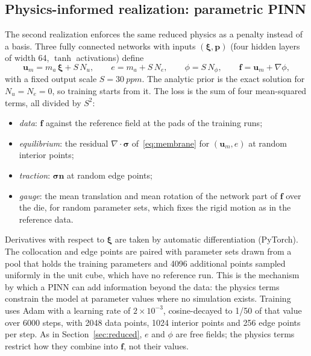 \documentclass[11pt]{article}
\begin{document}
\subsection{Physics-informed realization: parametric PINN}\label{sec:pinn}
The second realization enforces the same reduced physics as a penalty instead of a basis. Three fully connected
networks with inputs $(\boldsymbol\xi,\mathbf{p})$ (four hidden layers of width 64, $\tanh$ activations) define
\begin{equation}
  \mathbf{u}_m = m_a\,\boldsymbol\xi + S\,N_u,\qquad e = m_a + S\,N_e,\qquad \phi = S\,N_\phi,\qquad
  \mathbf{f} = \mathbf{u}_m + \nabla\phi ,
\end{equation}
with a fixed output scale $S=\SI{30}{ppm}$. The analytic prior is the exact solution for $N_u=N_e=0$, so training starts
from it. The loss is the sum of four mean-squared terms, all divided by $S^2$:
\begin{itemize}
  \item \emph{data}: $\mathbf{f}$ against the reference field at the pads of the training runs;
  \item \emph{equilibrium}: the residual $\nabla\cdot\boldsymbol\sigma$ of~\eqref{eq:membrane} for $(\mathbf{u}_m,e)$ at
        random interior points;
  \item \emph{traction}: $\boldsymbol\sigma\mathbf{n}$ at random edge points;
  \item \emph{gauge}: the mean translation and mean rotation of the network part of $\mathbf{f}$ over the die, for
        random parameter sets, which fixes the rigid motion as in the reference data.
\end{itemize}
Derivatives with respect to $\boldsymbol\xi$ are taken by automatic differentiation (PyTorch). The collocation and edge
points are paired with parameter sets drawn from a pool that holds the training parameters and 4096 additional points
sampled uniformly in the unit cube, which have no reference run. This is the mechanism by which a PINN can add
information beyond the data: the physics terms constrain the model at parameter values where no simulation exists.
Training uses Adam with a learning rate of $2\times10^{-3}$, cosine-decayed to 1/50 of that value over 6000 steps, with
2048 data points, 1024 interior points and 256 edge points per step. As in Section~\ref{sec:reduced}, $e$ and $\phi$ are
free fields; the physics terms restrict how they combine into $\mathbf{f}$, not their values.
\end{document}

